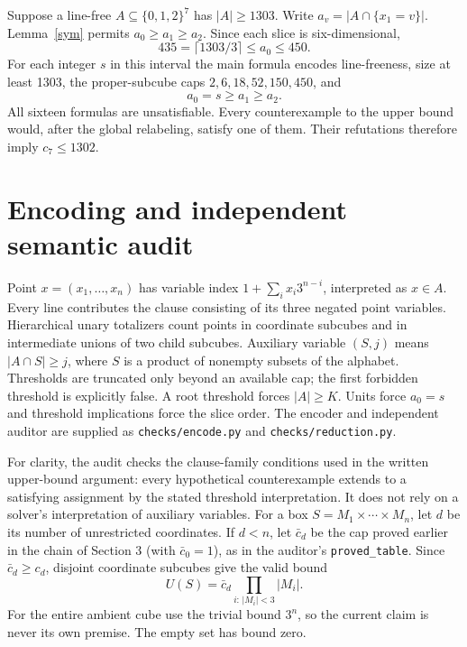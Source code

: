 \documentclass[11pt]{article}
\newcommand{\cube}[1]{\{0,1,2\}^{#1}}
\begin{document}
Suppose a line-free $A\subseteq\cube 7$ has $|A|\geq1303$. Write $a_v=|A\cap\{x_1=v\}|$. Lemma~\ref{sym} permits $a_0\geq a_1\geq a_2$. Since each slice is six-dimensional,
\[
435=\lceil1303/3\rceil\leq a_0\leq450.
\]
For each integer $s$ in this interval the main formula encodes line-freeness, size at least 1303, the proper-subcube caps $2,6,18,52,150,450$, and
\[
a_0=s\geq a_1\geq a_2.
\]
All sixteen formulas are unsatisfiable. Every counterexample to the upper bound would, after the global relabeling, satisfy one of them. Their refutations therefore imply $c_7\leq1302$.

\section{Encoding and independent semantic audit}\label{encoding}
Point $x=(x_1,\ldots,x_n)$ has variable index $1+\sum_i x_i3^{n-i}$, interpreted as $x\in A$. Every line contributes the clause consisting of its three negated point variables. Hierarchical unary totalizers count points in coordinate subcubes and in intermediate unions of two child subcubes. Auxiliary variable $(S,j)$ means $|A\cap S|\geq j$, where $S$ is a product of nonempty subsets of the alphabet. Thresholds are truncated only beyond an available cap; the first forbidden threshold is explicitly false. A root threshold forces $|A|\geq K$. Units force $a_0=s$ and threshold implications force the slice order. The encoder and independent auditor are supplied as \texttt{checks/encode.py} and \texttt{checks/reduction.py}.

For clarity, the audit checks the clause-family conditions used in the written upper-bound argument: every hypothetical counterexample extends to a satisfying assignment by the stated threshold interpretation. It does not rely on a solver's interpretation of auxiliary variables. For a box $S=M_1\times\cdots\times M_n$, let $d$ be its number of unrestricted coordinates. If $d<n$, let $\bar c_d$ be the cap proved earlier in the chain of Section 3 (with $\bar c_0=1$), as in the auditor's \texttt{proved\_table}. Since $\bar c_d\geq c_d$, disjoint coordinate subcubes give the valid bound
\[
U(S)=\bar c_d\prod_{i:\,|M_i|<3}|M_i|.
\]
For the entire ambient cube use the trivial bound $3^n$, so the current claim is never its own premise. The empty set has bound zero.
\end{document}
